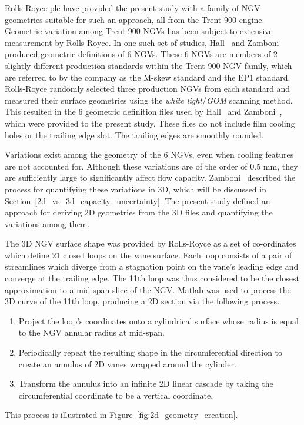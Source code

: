 \documentclass[a4paper, 11pt, oneside]{report}
\begin{document}
Rolls-Royce plc have provided the present study with a family of NGV geometries suitable for such an approach, all from the Trent 900 engine. Geometric variation among Trent 900 NGVs has been subject to extensive measurement by Rolls-Royce. In one such set of studies, Hall~\cite{hall_area} and Zamboni~\cite{zamboni_area} produced geometric definitions of 6 NGVs. These 6 NGVs are members of 2 slightly different production standards within the Trent 900 NGV family, which are referred to by the company as the M-skew standard and the EP1 standard. Rolls-Royce randomly selected three production NGVs from each standard and measured their surface geometries using the \textit{white light}/\textit{GOM} scanning method. This resulted in the 6 geometric definition files used by Hall~\cite{hall_area} and Zamboni~\cite{zamboni_area}, which were provided to the present study. These files do not include film cooling holes or the trailing edge slot. The trailing edges are smoothly rounded.

Variations exist among the geometry of the 6 NGVs, even when cooling features are not accounted for. Although these variations are of the order of $0.5$ mm, they are sufficiently large to significantly affect flow capacity. Zamboni~\cite{zamboni_area} described the process for quantifying these variations in 3D, which will be discussed in Section~\ref{2d_vs_3d_capacity_uncertainty}. The present study defined an approach for deriving 2D geometries from the 3D files and quantifying the variations among them.

The 3D NGV surface shape was provided by Rolls-Royce as a set of co-ordinates which define 21 closed loops on the vane surface. Each loop consists of a pair of streamlines which diverge from a stagnation point on the vane's leading edge and converge at the trailing edge. The 11th loop was thus considered to be the closest approximation to a mid-span slice of the NGV. Matlab was used to process the 3D curve of the 11th loop, producing a 2D section via the following process. 
\begin{enumerate}
  \item Project the loop's coordinates onto a cylindrical surface whose radius is equal to the NGV annular radius at mid-span.
  \item Periodically repeat the resulting shape in the circumferential direction to create an annulus of 2D vanes wrapped around the cylinder.
  \item Transform the annulus into an infinite 2D linear cascade by taking the circumferential coordinate to be a vertical coordinate.
\end{enumerate}
This process is illustrated in Figure~\ref{fig:2d_geometry_creation}.
\end{document}
